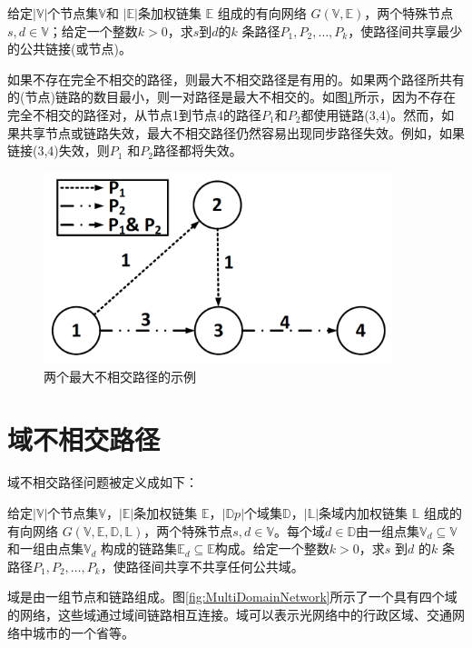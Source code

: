 \begin{definition}[最大不相交路径问题]
给定$|\mathbb{V}|$个节点集$\mathbb{V}$和 $|\mathbb{E}|$条加权链集 $\mathbb{E}$ 组成的有向网络 $G(\mathbb{V},\mathbb{E})$，两个特殊节点$s,d\in\mathbb{V}$；给定一个整数$k>0$，求$s$到$d$的$k$ 条路径$P_1,P_2,\ldots,P_k$，使路径间共享最少的公共链接(或节点)。
\end{definition}
如果不存在完全不相交的路径，则最大不相交路径是有用的。如果两个路径所共有的(节点)链路的数目最小，则一对路径是最大不相交的。如图\ref{fig:MaximallyDisjointPaths}所示，因为不存在完全不相交的路径对，从节点1到节点4的路径$P_1$和$P_2$都使用链路(3,4)。然而，如果共享节点或链路失效，最大不相交路径仍然容易出现同步路径失效。例如，如果链接(3,4)失效，则$P_1$ 和$P_2$路径都将失效。
\begin{figure}[htbp]
  \centering
  \includegraphics[width=4.0in]{figures/MaximallyDisjointPaths}
  \caption{两个最大不相交路径的示例}
  \label{fig:MaximallyDisjointPaths}
\end{figure}

\section{域不相交路径}
域不相交路径问题被定义成如下：

\begin{definition}[域不相交路径问题]
给定$|\mathbb{V}|$个节点集$\mathbb{V}$，$|\mathbb{E}|$条加权链集 $\mathbb{E}$，$|\mathbb{D}p|$个域集$\mathbb{D}$，$|\mathbb{L}|$条域内加权链集 $\mathbb{L}$ 组成的有向网络 $G(\mathbb{V},\mathbb{E},\mathbb{D},\mathbb{L})$，两个特殊节点$s,d\in\mathbb{V}$。每个域$d\in\mathbb{D}$由一组点集$\mathbb{V}_d\subseteq \mathbb{V}$和一组由点集$\mathbb{V}_d$ 构成的链路集$\mathbb{E}_d\subseteq \mathbb{E}$构成。给定一个整数$k>0$，求$s$ 到$d$ 的$k$ 条路径$P_1,P_2,\ldots,P_k$，使路径间共享不共享任何公共域。
\end{definition}

域是由一组节点和链路组成。图\ref{fig:MultiDomainNetwork}所示了一个具有四个域的网络，这些域通过域间链路相互连接。域可以表示光网络中的行政区域、交通网络中城市的一个省等。

